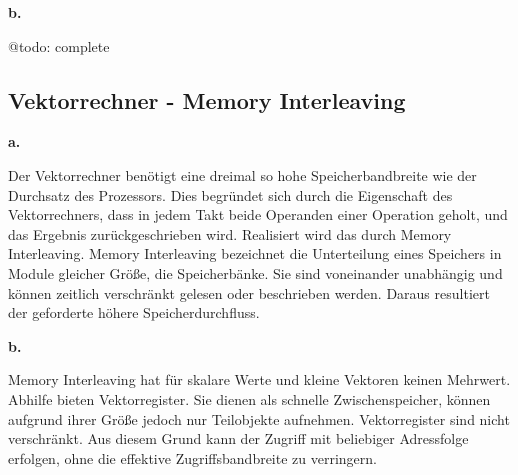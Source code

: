 \documentclass[12pt]{article}
\begin{document}
\noindent \textbf{b.}

@todo: complete

\subsection{Vektorrechner - Memory Interleaving}

\noindent \textbf{a.}

Der Vektorrechner benötigt eine dreimal so hohe Speicherbandbreite wie der Durchsatz des Prozessors.
Dies begründet sich durch die Eigenschaft des Vektorrechners, dass in jedem Takt beide Operanden einer Operation geholt, und das Ergebnis zurückgeschrieben wird.
Realisiert wird das durch Memory Interleaving.
Memory Interleaving bezeichnet die Unterteilung eines Speichers in Module gleicher Größe, die Speicherbänke.
Sie sind voneinander unabhängig und können zeitlich verschränkt gelesen oder beschrieben werden.
Daraus resultiert der geforderte höhere Speicherdurchfluss.

\noindent \textbf{b.}

Memory Interleaving hat für skalare Werte und kleine Vektoren keinen Mehrwert.
Abhilfe bieten Vektorregister.
Sie dienen als schnelle Zwischenspeicher, können aufgrund ihrer Größe jedoch nur Teilobjekte aufnehmen.
Vektorregister sind nicht verschränkt.
Aus diesem Grund kann der Zugriff mit beliebiger Adressfolge erfolgen, ohne die effektive Zugriffsbandbreite zu verringern.
\end{document}
